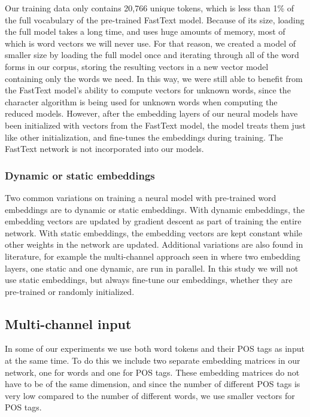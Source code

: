 Our training data only contains 20,766 unique tokens, which is less than 1\%
of the full vocabulary of the pre-trained FastText model. Because of its
size, loading the full model takes a long time, and uses huge amounts of
memory, most of which is word vectors we will never use. For that reason, we
created a model of smaller size by loading the full model once and iterating
through all of the word forms in our corpus, storing the resulting vectors in
a new vector model containing only the words we need. In this way, we were
still able to benefit from the FastText model's ability to compute vectors
for unknown words, since the character \ngram algorithm is being used for
unknown words when computing the reduced models. However, after the embedding
layers of our neural models have been initialized with vectors from the
FastText model, the model treats them just like other initialization, and
fine-tunes the embeddings during training. The FastText network is not
incorporated into our models.


\subsubsection{Dynamic or static embeddings}

Two common variations on training a neural model with pre-trained word
embeddings are to dynamic or static embeddings. With dynamic embeddings, the
embedding vectors are updated by gradient descent as part of training the
entire network. With static embeddings, the embedding vectors are kept
constant while other weights in the network are updated. Additional
variations are also found in literature, for example the multi-channel
approach seen in \textcite{kim2014convolutional} where two embedding layers,
one static and one dynamic, are run in parallel. In this study we will not
use static embeddings, but always fine-tune our embeddings, whether they are
pre-trained or randomly initialized.


\subsection{Multi-channel input}

In some of our experiments we use both word tokens and their POS tags as
input at the same time. To do this we include two separate embedding matrices
in our network, one for words and one for POS tags. These embedding matrices
do not have to be of the same dimension, and since the number of different
POS tags is very low compared to the number of different words, we use
smaller vectors for POS tags.


